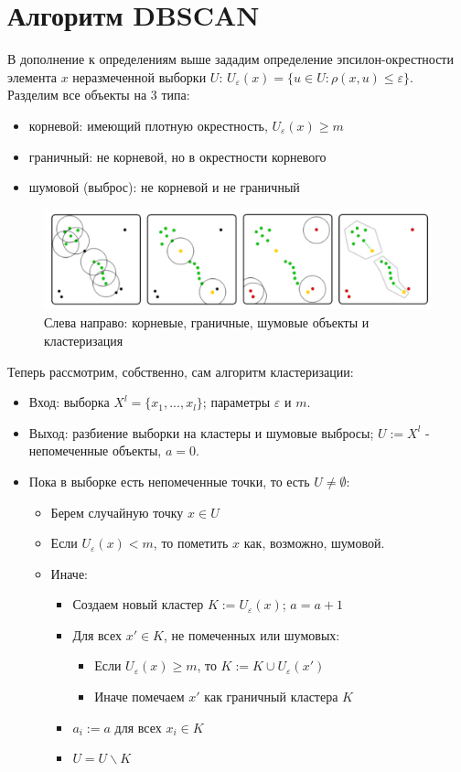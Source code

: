 \section*{Алгоритм DBSCAN}
В дополнение к определениям выше зададим определение эпсилон-окрестности элемента $x$ неразмеченной выборки $U$: $U_{\varepsilon}(x) = \{ u \in U: \rho(x, u) \leq \varepsilon \}$. Разделим все объекты на 3 типа:
\begin{itemize}
    \item корневой: имеющий плотную окрестность, $U_{\varepsilon}(x) \geq m$
    \item граничный: не корневой, но в окрестности корневого
    \item шумовой (выброс): не корневой и не граничный
\end{itemize}
\begin{figure}[h]
    \centering
    \includegraphics[width=0.47\linewidth]{objects.png}
    \caption{Слева направо: корневые, граничные, шумовые объекты и кластеризация}
    \label{fig:enter-label}
\end{figure}
\par
Теперь рассмотрим, собственно, сам алгоритм кластеризации:
\begin{itemize}
    \item Вход: выборка $X^{l} = \{ x_1, ..., x_l\}$; параметры $\varepsilon$ и $m$.
    \item Выход: разбиение выборки на кластеры и шумовые выбросы; $U := X^{l}$ - непомеченные объекты, $a = 0$.
    \item Пока в выборке есть непомеченные точки, то есть $U \neq \emptyset$:
    \begin{itemize}
        \item Берем случайную точку $x \in U$
        \item Если $U_{\varepsilon}(x) < m$, то пометить $x$ как, возможно, шумовой.
        \item Иначе:
        \begin{itemize}
            \item Создаем новый кластер $K := U_{\varepsilon}(x)$; $a = a + 1$
            \item Для всех $x' \in K$, не помеченных или шумовых:
            \begin{itemize}
                \item Если $U_{\varepsilon}(x) \geq m$, то $K := K \cup U_{\varepsilon}(x')$
                \item Иначе помечаем $x'$ как граничный кластера $K$ 
            \end{itemize}
            \item $a_i := a$ для всех $x_i \in K$
            \item $U = U \backslash K$
        \end{itemize}
    \end{itemize}
\end{itemize}

